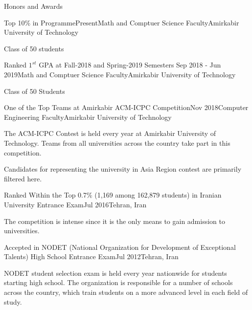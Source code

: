 \documentclass{resume} %
\begin{document}
	\begin{rSection}{Honors and Awards}
		\begin{rSubsection}{Top 10\% in Programme}{Present}{Math and Comptuer Science Faculty}{Amirkabir University of Technology}
			\item Class of 50 students
		\end{rSubsection}
		
		\begin{rSubsection}{Ranked $1^{st}$ GPA at Fall-2018 and Spring-2019 Semesters }{Sep 2018 - Jun 2019}{Math and Comptuer Science Faculty}{Amirkabir University of Technology}
			\item Class of 50 Students
		\end{rSubsection}	
		
		\begin{rSubsection}{One of the Top Teams at Amirkabir ACM-ICPC Competition}{Nov 2018}{Computer Engineering Faculty}{Amirkabir University of Technology}
			\item The ACM-ICPC Contest is held every year at Amirkabir University of Technology. Teams from all universities across the country take part in this competition.
			\item Candidates for representing the university in Asia Region contest are primarily filtered here.
		\end{rSubsection}
		
		\begin{rSubsection}{Ranked Within the Top 0.7\% (1,169 among 162,879 students) in Iranian University Entrance Exam}{Jul 2016}{Tehran, Iran }{ }
			\item The competition is intense since it is the only means to gain admission to universities.
		\end{rSubsection} 
		
		\begin{rSubsection}{Accepted in NODET (National Organization for Development of Exceptional Talents) High School Entrance Exam}{Jul 2012}{Tehran, Iran }{ }
			\item NODET student selection exam is held every year nationwide for students starting high school. The organization is responsible for a number of schools across the country, which train students on a more advanced level in each field of study.
		\end{rSubsection}
		
	\end{rSection}
\end{document}
